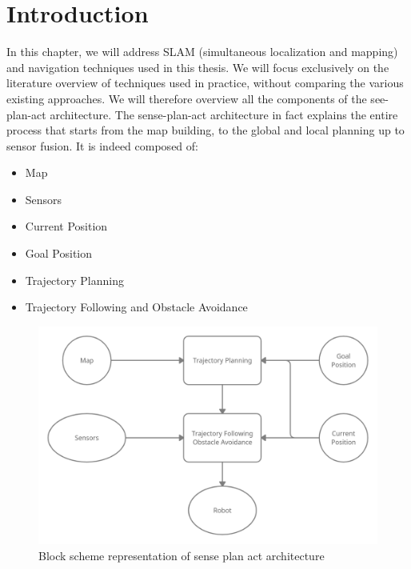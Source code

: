 \section{Introduction}
In this chapter, we will address SLAM (simultaneous localization and mapping) and navigation techniques used in this thesis. We will focus exclusively on the literature overview of techniques used in practice, without comparing the various existing approaches. We will therefore overview all the components of the see-plan-act architecture.
The sense-plan-act architecture in fact explains the entire process that starts from the map building, to the global and local planning up to sensor fusion.
It is indeed composed of:
\begin{itemize}
    \item Map
    \item Sensors 
    \item Current Position
    \item Goal Position
    \item Trajectory Planning
    \item Trajectory Following and Obstacle Avoidance
\end{itemize}

\begin{figure}[H]
    \centering
    \includegraphics[scale=0.25]{Images/Chapter 4/senseplanact.png}
    \caption{Block scheme representation of sense plan act architecture}
    \label{fig:my_label}
\end{figure}

